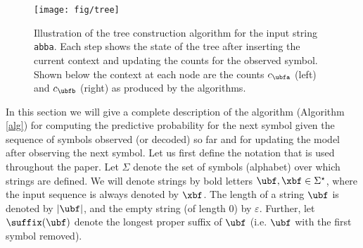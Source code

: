 \newcommand{\treefigure}{
\begin{figure*}[t]
\begin{center}
    \texttt{[image: fig/tree]}
\end{center}
\caption{Illustration of the tree construction algorithm for the input string
\texttt{abba}. Each step shows the state of the tree after inserting the
current context and updating the counts for the observed symbol.  Shown below
the context at each node are the counts $c_{\ubf \mathtt{a}}$ (left) and
$c_{\ubf \mathtt{b}}$ (right) as produced by the algorithms.}
%
\label{fig:tree}
\end{figure*}
}
\label{algorithm}
\treefigure
\AlgorithmBox
In this section we will give a complete description of the algorithm (Algorithm \ref{alg}) for
computing the predictive probability for the next symbol given the sequence of
symbols observed (or decoded) so far and for updating the model after
observing the next symbol.
%
Let us first define the notation that is used throughout the
paper.  Let $\Sigma$ denote the set of symbols (alphabet) over which strings
are defined.  We will denote strings by bold letters  $\ubf, \xbf \in
\Sigma^\star$, where the input sequence is always denoted by $\xbf$. The length of a
string $\ubf$ is denoted by $|\ubf|$, and the empty string (of length 0) by
$\varepsilon$. 
Further, let $\suffix(\ubf)$ denote the longest proper suffix of $\ubf$ (i.e.
$\ubf$ with the first symbol removed).

